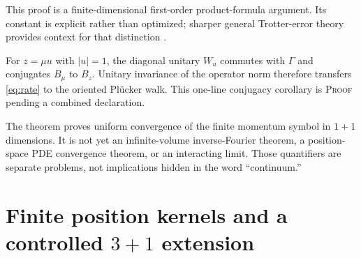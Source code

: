 \documentclass[11pt]{article}
\newcommand{\Human}{\textcolor{humanproofcolor}{\textsc{Proof}}}
\begin{document}
This proof is a finite-dimensional first-order product-formula argument.  Its
constant is explicit rather than optimized; sharper general Trotter-error
theory provides context for that distinction \cite{ChildsTrotter}.

For $z=\mu u$ with $|u|=1$, the diagonal unitary $W_u$ commutes with $\Gamma$
and conjugates $B_\mu$ to $B_z$.  Unitary invariance of the operator norm
therefore transfers \eqref{eq:rate} to the oriented Pl\"ucker walk.  This
one-line conjugacy corollary is \Human{} pending a combined declaration.

The theorem proves uniform convergence of the finite momentum symbol in
$1+1$ dimensions.  It is not yet an infinite-volume inverse-Fourier theorem,
a position-space PDE convergence theorem, or an interacting limit.  Those
quantifiers are separate problems, not implications hidden in the word
``continuum.''

\section{Finite position kernels and a controlled $3+1$ extension}
\label{sec:threeplusone}
\end{document}
